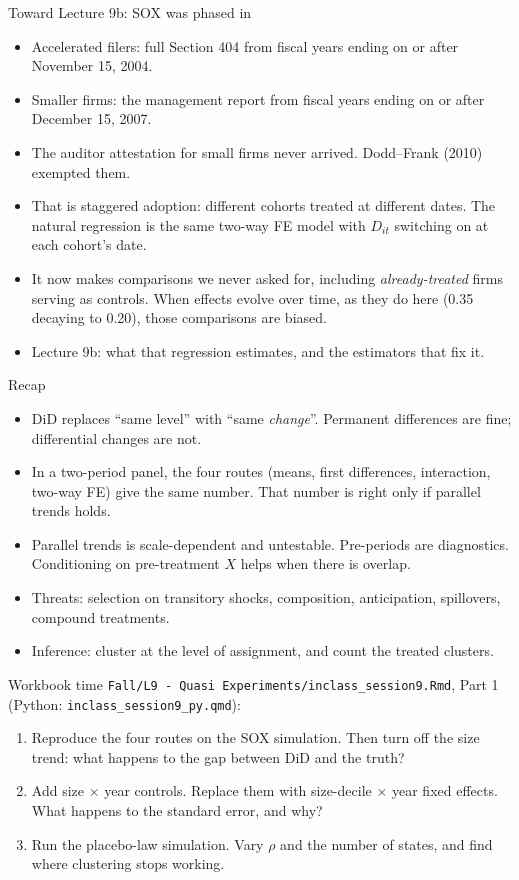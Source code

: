 \documentclass[aspectratio=169,11pt]{beamer}
\begin{document}
\begin{frame}{Toward Lecture 9b: SOX was phased in}
\begin{itemize}
	\item Accelerated filers: full Section 404 from fiscal years ending on or after November 15, 2004.
	\item Smaller firms: the management report from fiscal years ending on or after December 15, 2007.
	\item The auditor attestation for small firms never arrived. Dodd--Frank (2010) exempted them.
	\medskip
	\item That is \alert{staggered adoption}: different cohorts treated at different dates. The natural regression
	is the same two-way FE model with $D_{it}$ switching on at each cohort's date.
	\medskip
	\item It now makes comparisons we never asked for, including \emph{already-treated} firms serving as controls.
	When effects evolve over time, as they do here (0.35 decaying to 0.20), those comparisons are biased.
	\medskip
	\item Lecture 9b: what that regression estimates, and the estimators that fix it.
\end{itemize}
\end{frame}


\begin{frame}{Recap}
\begin{itemize}
	\item DiD replaces ``same level'' with ``same \emph{change}''. Permanent differences are fine; differential
	changes are not.
	\medskip
	\item In a two-period panel, the four routes (means, first differences, interaction, two-way FE) give the
	same number. That number is right only if parallel trends holds.
	\medskip
	\item Parallel trends is scale-dependent and untestable. Pre-periods are diagnostics. Conditioning on
	pre-treatment $X$ helps when there is overlap.
	\medskip
	\item Threats: selection on transitory shocks, composition, anticipation, spillovers, compound treatments.
	\medskip
	\item Inference: cluster at the level of assignment, and count the treated clusters.
\end{itemize}
\end{frame}


\begin{frame}{Workbook time}
\texttt{Fall/L9 - Quasi Experiments/inclass\_session9.Rmd}, Part 1 (Python: \texttt{inclass\_session9\_py.qmd}):
\begin{enumerate}
	\item Reproduce the four routes on the SOX simulation. Then turn off the size trend: what happens to the gap
	between DiD and the truth?
	\item Add size $\times$ year controls. Replace them with size-decile $\times$ year fixed effects. What happens
	to the standard error, and why?
	\item Run the placebo-law simulation. Vary $\rho$ and the number of states, and find where clustering stops
	working.
\end{enumerate}
\end{frame}
\end{document}
